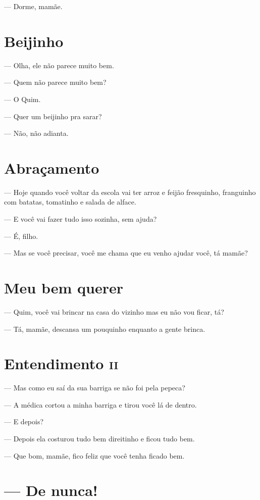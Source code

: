 --- Dorme, mamãe.

\chapter{Beijinho}\label{beijinho}

--- Olha, ele não parece muito bem.

--- Quem não parece muito bem?

--- O Quim.

--- Quer um beijinho pra sarar?

--- Não, não adianta.

\chapter{Abraçamento}\label{abrauxe7amento}

--- Hoje quando você voltar da escola vai ter arroz e feijão fresquinho,
franguinho com batatas, tomatinho e salada de alface.

--- E você vai fazer tudo isso sozinha, sem ajuda?

--- É, filho.

--- Mas se você precisar, você me chama que eu venho ajudar você, tá
mamãe?

\chapter{Meu bem querer}\label{meu-bem-querer}

--- Quim, você vai brincar na casa do vizinho mas eu não vou ficar, tá?

--- Tá, mamãe, descansa um pouquinho enquanto a gente brinca.

\chapter{Entendimento \textsc{ii}}

--- Mas como eu saí da sua barriga se não foi pela pepeca?

--- A médica cortou a minha barriga e tirou você lá de dentro.

--- E depois?

--- Depois ela costurou tudo bem direitinho e ficou tudo bem.

--- Que bom, mamãe, fico feliz que você tenha ficado bem.

\chapter{--- De nunca!}\label{de-nunca}

